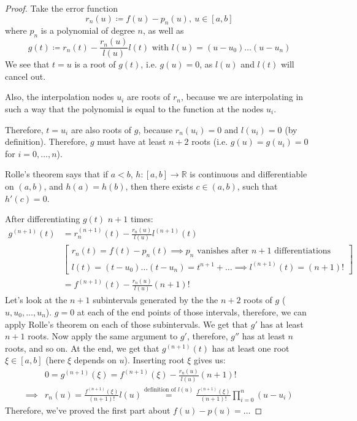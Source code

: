 \begin{proof}
    Take the error function
    \[ r_n(u) \coloneqq f(u) - p_n(u),\ u \in [a, b] \]
    where $p_n$ is a polynomial of degree $n$,
    as well as
    \[
        g(t) \coloneqq r_n(t) - \frac{r_n(u)}{l(u)} l(t)
        \text{ with } l(u) = (u - u_0) \dots (u - u_n)
    \]
    We see that $t = u$ is a root of $g(t)$, i.e.
    $g(u) = 0$, as $l(u)$ and $l(t)$ will cancel out.

    Also, the interpolation nodes $u_i$ are roots of $r_n$, because
    we are interpolating in such a way that the polynomial is equal
    to the function at the nodes $u_i$.

    Therefore, $t = u_i$ are also roots of $g$, because
    $r_n(u_i) = 0$ and $l(u_i) = 0$ (by definition).
    Therefore, $g$ must have at least $n + 2$ roots 
    (i.e. $g(u) = g(u_i) = 0$ for $i = 0, \dots, n$).

    Rolle's theorem says that if $a < b$, $h : [a, b] \to \mathbb{R}$
    is continuous and differentiable on $(a, b)$, and $h(a) = h(b)$,
    then there exists $c \in (a, b)$, such that $h'(c) = 0$.

    After differentiating $g(t)$ $n + 1$ times:
    \begin{align*}
        g^{(n+1)}(t) &= r_n^{(n+1)}(t) - \frac{r_n(u)}{l(u)} l^{(n+1)}(t)\\
        &\left[
            \begin{array}{c}
                r_n(t) = f(t) - p_n(t) \implies p_n \text{ vanishes after $n+1$ differentiations}\\
                l(t) = (t - u_0)\dots(t-u_n) = t^{n+1} + \ldots \implies
                l^{(n+1)}(t) = (n + 1)!
            \end{array}
        \right]\\
        &= f^{(n+1)}(t) - \frac{r_n(u)}{l(u)} (n + 1)!
    \end{align*}
    Let's look at the $n + 1$ subintervals generated by the the $n + 2$ roots of $g$
    ($u, u_0, \dots, u_n$). $g = 0$ at each of the end points of those intervals,
    therefore, we can apply Rolle's theorem on each of those subintervals.
    We get that $g'$ has at least $n + 1$ roots. Now apply the same argument
    to $g'$, therefore, $g''$ has at least $n$ roots, and so on.
    At the end, we get that $g^{(n+1)}(t)$ has at least one root $\xi \in [a, b]$
    (here $\xi$ depends on $u$). Inserting root $\xi$ gives us:
    \begin{align*}
        &0 = g^{(n+1)}(\xi) = f^{(n+1)}(\xi) - \frac{r_n(u)}{l(u)} (n + 1)!\\
        \implies &r_n(u) = \frac{f^{(n+1)}(\xi)}{(n+1)!} l(u)
        \overset{\text{definition of $l(u)$}}{=}
        \frac{f^{(n+1)}(\xi)}{(n+1)!} \prod_{i=0}^n (u - u_i)
    \end{align*}
    Therefore, we've proved the first part about $f(u) - p(u) = \dots$


\end{proof}
